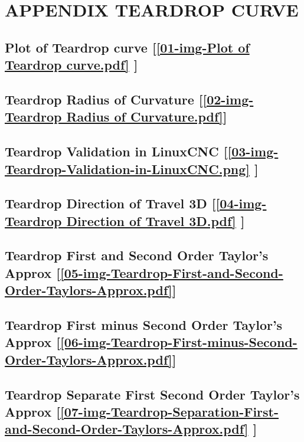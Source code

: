 \section{\textbf{APPENDIX TEARDROP CURVE}} \label{APPENDIX TEARDROP CURVE}



\subsection       {Plot of Teardrop curve
	[\ref  {01-img-Plot of Teardrop curve.pdf} ] }
\label{ssec-01-img-Plot of Teardrop curve.pdf}

\subsection       {Teardrop Radius of Curvature
	[\ref      {02-img-Teardrop Radius of Curvature.pdf}] }
\label{ssec-02-img-Teardrop Radius of Curvature.pdf}

\subsection       {Teardrop Validation in LinuxCNC
	[\ref      {03-img-Teardrop-Validation-in-LinuxCNC.png} ] }
\label{ssec-03-img-Teardrop-Validation-in-LinuxCNC.png}

\subsection     {Teardrop Direction of Travel 3D
	[\ref      {04-img-Teardrop Direction of Travel 3D.pdf} ] }
\label{ssec-04-img-Teardrop Direction of Travel 3D.pdf}

\subsection       {Teardrop First and Second Order Taylor's Approx
	[\ref      {05-img-Teardrop-First-and-Second-Order-Taylors-Approx.pdf}] }
\label{ssec-05-img-Teardrop-First-and-Second-Order-Taylors-Approx.pdf}

\subsection       {Teardrop First minus Second Order Taylor's Approx
	[\ref      {06-img-Teardrop-First-minus-Second-Order-Taylors-Approx.pdf}] }
\label{ssec-06-img-Teardrop-First-minus-Second-Order-Taylors-Approx.pdf}

\subsection       {Teardrop Separate First Second Order Taylor's Approx
	[\ref      {07-img-Teardrop-Separation-First-and-Second-Order-Taylors-Approx.pdf} ] }
\label{ssec-07-img-Teardrop-Separation-First-and-Second-Order-Taylors-Approx.pdf}

